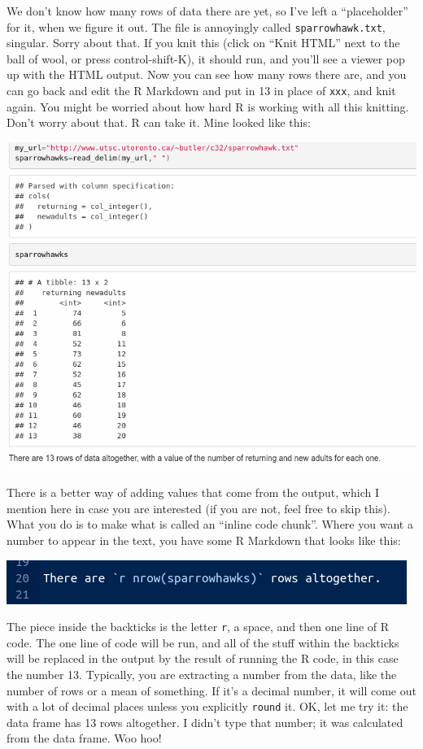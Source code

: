 \documentclass[]{tufte-book}
\theoremstyle{definition}
\theoremstyle{definition}
\theoremstyle{definition}
\theoremstyle{remark}
\begin{document}
We don't know how many rows of data there are yet, so I've left a
``placeholder'' for it, when we figure it out. The file is annoyingly
called \texttt{sparrowhawk.txt}, singular. Sorry about that. If you knit
this (click on ``Knit HTML'' next to the ball of wool, or press
control-shift-K), it should run, and you'll see a viewer pop up with the
HTML output. Now you can see how many rows there are, and you can go
back and edit the R Markdown and put in 13 in place of \texttt{xxx}, and
knit again. You might be worried about how hard R is working with all
this knitting. Don't worry about that. R can take it. Mine looked like
this:

\includegraphics{waluj.png}

There is a better way of adding values that come from the output, which
I mention here in case you are interested (if you are not, feel free to
skip this). What you do is to make what is called an ``inline code
chunk''. Where you want a number to appear in the text, you have some R
Markdown that looks like this:

\includegraphics{sh3.png}

The piece inside the backticks is the letter \texttt{r}, a space, and
then one line of R code. The one line of code will be run, and all of
the stuff within the backticks will be replaced in the output by the
result of running the R code, in this case the number 13. Typically, you
are extracting a number from the data, like the number of rows or a mean
of something. If it's a decimal number, it will come out with a lot of
decimal places unless you explicitly \texttt{round} it. OK, let me try
it: the data frame has 13 rows altogether. I didn't type that number; it
was calculated from the data frame. Woo hoo!
\end{document}
